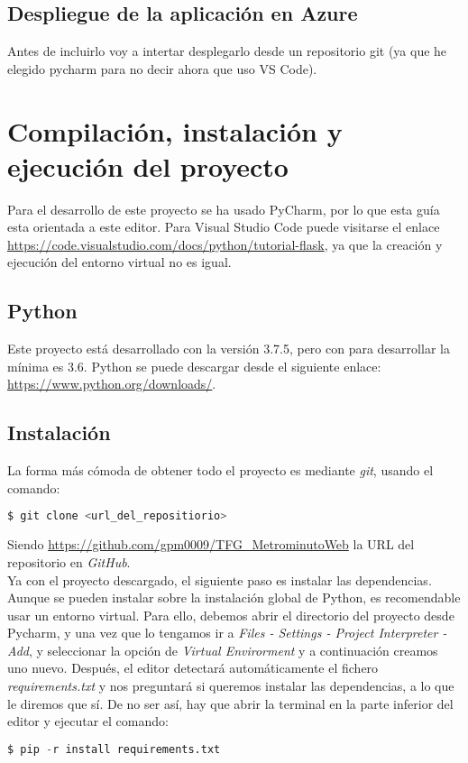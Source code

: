 \subsection{Despliegue de la aplicación en Azure}
Antes de incluirlo voy a intertar desplegarlo desde un repositorio git (ya que he elegido pycharm para no decir ahora que uso VS Code).


\section{Compilación, instalación y ejecución del proyecto}
Para el desarrollo de este proyecto se ha usado PyCharm, por lo que esta guía esta orientada a este editor. Para Visual Studio Code puede visitarse el enlace \url{https://code.visualstudio.com/docs/python/tutorial-flask}, ya que la creación y ejecución del entorno virtual no es igual.

\subsection{Python}
Este proyecto está desarrollado con la versión 3.7.5, pero con para desarrollar la mínima es 3.6. Python se puede descargar desde el siguiente enlace: \url{https://www.python.org/downloads/}.

\subsection{Instalación}
La forma más cómoda de obtener todo el proyecto es mediante \textit{git}, usando el comando:
\renewcommand{\lstlistingname}{Isntalación}%
\renewcommand{\lstlistlistingname}{List of \lstlistingname s}
\begin{lstlisting}[language=python,caption={Descargar el repositorio.}]
 $ git clone <url_del_repositiorio>
\end{lstlisting}
Siendo \url{https://github.com/gpm0009/TFG_MetrominutoWeb} la URL del repositorio en \textit{GitHub}.
\\
Ya con el proyecto descargado, el siguiente paso es instalar las dependencias. Aunque se pueden instalar sobre la instalación global de Python, es recomendable usar un entorno virtual. Para ello, debemos abrir el directorio del proyecto desde Pycharm, y una vez que lo tengamos ir a \textit{Files - Settings - Project Interpreter - Add}, y seleccionar la opción de \textit{Virtual Envirorment} y a continuación creamos uno nuevo.
Después, el editor detectará automáticamente el fichero \textit{requirements.txt} y nos preguntará si queremos instalar las dependencias, a lo que le diremos que sí. De no ser así, hay que abrir la terminal en la parte inferior del editor y ejecutar el comando:
\begin{lstlisting}[language=python,caption={Instalar dependencias en el entorno virtual.}]
$ pip -r install requirements.txt
\end{lstlisting}

